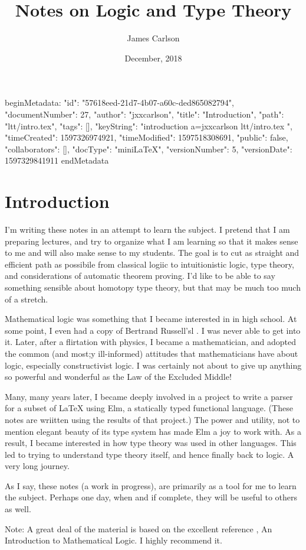beginMetadata:
{
    "id": "57618eed-21d7-4b07-a60c-ded865082794",
    "documentNumber": 27,
    "author": "jxxcarlson",
    "title": "Introduction",
    "path": "ltt/intro.tex",
    "tags": [],
    "keyString": "introduction a=jxxcarlson ltt/intro.tex ",
    "timeCreated": 1597326974921,
    "timeModified": 1597518308691,
    "public": false,
    "collaborators": [],
    "docType": "miniLaTeX",
    "versionNumber": 5,
    "versionDate": 1597329841911
}
endMetadata


\title{Notes on Logic and Type Theory}
\author{James Carlson}
\date{December, 2018}

\maketitle

\maintableofcontents



\section{Introduction}

I'm writing these notes in an attempt to learn the subject.  I pretend that I am preparing lectures, and try to organize what I am learning so that it makes sense to me and will also make sense to my students. The goal is to cut as straight and efficient path as possibile from classical logiic to intuitionistic logic, type theory, and considerations of automatic theorem proving.  I'd like to be able to say something sensible about homotopy type theory, but that may be much too much of a stretch.

Mathematical logic was something that I became interested in in high school.  At some point, I even had a copy of Bertrand Russell'sl .  I was never able to get into it.  Later, after a flirtation with physics, I became a mathematician, and adopted the common (and most;y ill-informed) attitudes that mathematicians have about logic, especially constructivist logic.  I was certainly not about to give up anything so powerful and wonderful as the Law of the Excluded Middle!

Many, many years later, I became deeply involved in a project to write a parser for a subset of LaTeX using Elm, a statically typed functional language.  (These notes are wriitten using the results of that project.) The power and utility, not to mention elegant beauty of its type system has made Elm a joy to work with.  As a result,  I became interested in how type theory was used  in other languages. This led to trying to understand type theory itself, and hence finally back to logic. A very long journey.

As I say, these notes (a work in progress), are primarily as a tool for me to learn the subject.  Perhaps one day, when and if complete, they will be useful to others as well.


Note: A great deal of the material is based on the excellent reference \cite{RH}, An Introduction to Mathematical Logic. I highly recommend it.
